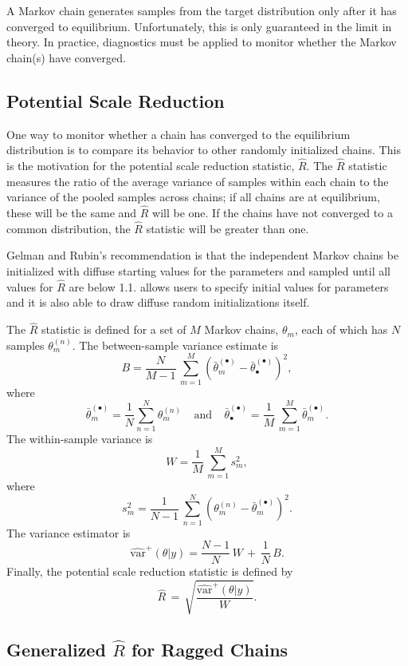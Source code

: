 A Markov chain generates samples from the target distribution only
after it has converged to equilibrium.  Unfortunately, this is only
guaranteed in the limit in theory.  In practice, diagnostics must be
applied to monitor whether the Markov chain(s) have converged.

\subsection{Potential Scale Reduction}

One way to monitor whether a chain has converged to the equilibrium
distribution is to compare its behavior to other randomly initialized
chains.  This is the motivation for the \cite{GelmanRubin:1992}
potential scale reduction statistic, $\hat{R}$.  The $\hat{R}$
statistic measures the ratio of the average variance of samples within
each chain to the variance of the pooled samples across chains; if all
chains are at equilibrium, these will be the same and $\hat{R}$ will
be one.  If the chains have not converged to a common distribution,
the $\hat{R}$ statistic will be greater than one.

Gelman and Rubin's recommendation is that the independent Markov
chains be initialized with diffuse starting values for the parameters
and sampled until all values for $\hat{R}$ are below 1.1.  \Stan
allows users to specify initial values for parameters and it is also
able to draw diffuse random initializations itself.

The $\hat{R}$ statistic is defined for a set of $M$ Markov chains,
$\theta_m$, each of which has $N$ samples $\theta^{(n)}_m$.  The
between-sample variance estimate is
\[
B
= \frac{N}{M-1} \, \sum_{m=1}^M (\bar{\theta}^{(\bullet)}_{m} - \bar{\theta}^{(\bullet)}_{\bullet})^2,
\]
%
where
%
\[
\bar{\theta}_m^{(\bullet)}
= \frac{1}{N} \sum_{n = 1}^N \theta_m^{(n)}
\ \ \ \ \
\mbox{and}
\ \ \ \ \
\bar{\theta}^{(\bullet)}_{\bullet}
= \frac{1}{M} \, \sum_{m=1}^M \bar{\theta}_m^{(\bullet)}.
\]
%
The within-sample variance is
\[
W 
= \frac{1}{M} \, \sum_{m=1}^M s_m^2,
\]
where
\[
s_m^2 = \frac{1}{N-1} \, \sum_{n=1}^N (\theta^{(n)}_m - \bar{\theta}^{(\bullet)}_m)^2.
\]
%
The variance estimator is
\[
\widehat{\mbox{var}}^{+}\!(\theta|y)
= \frac{N-1}{N}\, W \, + \, \frac{1}{N} \, B.
\]
%
Finally, the potential scale reduction statistic is defined by
\[
\hat{R} 
\, = \,
\sqrt{\frac{\widehat{\mbox{var}}^{+}\!(\theta|y)}{W}}.
\]

\subsection{Generalized $\hat{R}$ for Ragged Chains}

